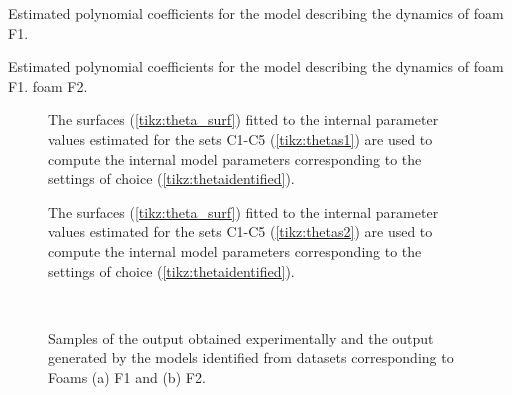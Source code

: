 \documentclass[a4paper,11pt,twoside]{article}
\theoremstyle{mytheoremstyle}
\begin{document}
 \begin{table}[!h]
	\centering
	\caption{Estimated polynomial coefficients for the model describing the dynamics of  foam F1.}\label{tab:betasC15}
	\small
	
\end{table}
\begin{table}[!h]
	\centering
	\caption{Estimated polynomial coefficients for the model describing the dynamics of  foam F1. foam F2.}\label{tab:betasC610}
	\small
	
\end{table}

\begin{figure}[!t]
	\centering
	
	\caption{The  surfaces (\ref{tikz:theta_surf}) fitted to the internal parameter values estimated for the sets C1-C5 (\ref{tikz:thetas1}) are  used to compute the internal model parameters corresponding to the settings of choice (\ref{tikz:thetaidentified}).}\label{fig:surfaces_C15}
\end{figure}

\begin{figure}[!h]
	\centering
	
	\caption{The  surfaces (\ref{tikz:theta_surf}) fitted to the internal parameter values estimated for the sets C1-C5 (\ref{tikz:thetas2}) are  used to compute the internal model parameters corresponding to the settings of choice (\ref{tikz:thetaidentified}).}\label{fig:surfaces_C610}
\end{figure}

\begin{figure}[!h]
	\centering
	\subfloat[C3]{\label{fig:c3c15}}\\
	\subfloat[C8]{\label{fig:c8c610}}
	\caption{Samples of the output obtained experimentally and the output generated by the models identified from datasets corresponding to Foams (a) F1 and (b) F2.}\label{fig:Csubsets}
\end{figure}
\printbibliography
\end{document}
